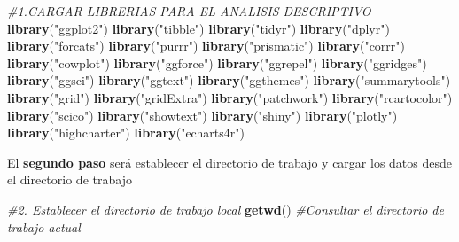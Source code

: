 \documentclass[
]{article}
\newenvironment{Shaded}{\begin{snugshade}}{\end{snugshade}}
\newcommand{\CommentTok}[1]{\textcolor[rgb]{0.56,0.35,0.01}{\textit{#1}}}
\newcommand{\FunctionTok}[1]{\textcolor[rgb]{0.13,0.29,0.53}{\textbf{#1}}}
\newcommand{\NormalTok}[1]{#1}
\newcommand{\StringTok}[1]{\textcolor[rgb]{0.31,0.60,0.02}{#1}}
\begin{document}
\begin{Shaded}
\begin{Highlighting}[]
\CommentTok{\#1.CARGAR LIBRERIAS PARA EL ANALISIS DESCRIPTIVO}
\FunctionTok{library}\NormalTok{(}\StringTok{"ggplot2"}\NormalTok{)}
\FunctionTok{library}\NormalTok{(}\StringTok{"tibble"}\NormalTok{)}
\FunctionTok{library}\NormalTok{(}\StringTok{"tidyr"}\NormalTok{)}
\FunctionTok{library}\NormalTok{(}\StringTok{"dplyr"}\NormalTok{)}
\FunctionTok{library}\NormalTok{(}\StringTok{"forcats"}\NormalTok{)}
\FunctionTok{library}\NormalTok{(}\StringTok{"purrr"}\NormalTok{)}
\FunctionTok{library}\NormalTok{(}\StringTok{"prismatic"}\NormalTok{)}
\FunctionTok{library}\NormalTok{(}\StringTok{"corrr"}\NormalTok{)}
\FunctionTok{library}\NormalTok{(}\StringTok{"cowplot"}\NormalTok{)}
\FunctionTok{library}\NormalTok{(}\StringTok{"ggforce"}\NormalTok{)}
\FunctionTok{library}\NormalTok{(}\StringTok{"ggrepel"}\NormalTok{)}
\FunctionTok{library}\NormalTok{(}\StringTok{"ggridges"}\NormalTok{)}
\FunctionTok{library}\NormalTok{(}\StringTok{"ggsci"}\NormalTok{)}
\FunctionTok{library}\NormalTok{(}\StringTok{"ggtext"}\NormalTok{)}
\FunctionTok{library}\NormalTok{(}\StringTok{"ggthemes"}\NormalTok{)}
\FunctionTok{library}\NormalTok{(}\StringTok{"summarytools"}\NormalTok{)}
\FunctionTok{library}\NormalTok{(}\StringTok{"grid"}\NormalTok{)}
\FunctionTok{library}\NormalTok{(}\StringTok{"gridExtra"}\NormalTok{)}
\FunctionTok{library}\NormalTok{(}\StringTok{"patchwork"}\NormalTok{)}
\FunctionTok{library}\NormalTok{(}\StringTok{"rcartocolor"}\NormalTok{)}
\FunctionTok{library}\NormalTok{(}\StringTok{"scico"}\NormalTok{)}
\FunctionTok{library}\NormalTok{(}\StringTok{"showtext"}\NormalTok{)}
\FunctionTok{library}\NormalTok{(}\StringTok{"shiny"}\NormalTok{)}
\FunctionTok{library}\NormalTok{(}\StringTok{"plotly"}\NormalTok{)}
\FunctionTok{library}\NormalTok{(}\StringTok{"highcharter"}\NormalTok{)}
\FunctionTok{library}\NormalTok{(}\StringTok{"echarts4r"}\NormalTok{)}
\end{Highlighting}
\end{Shaded}

El \textbf{segundo paso} será establecer el directorio de trabajo y
cargar los datos desde el directorio de trabajo

\begin{Shaded}
\begin{Highlighting}[]
\CommentTok{\#2. Establecer el directorio de trabajo local}
\FunctionTok{getwd}\NormalTok{() }\CommentTok{\#Consultar el directorio de trabajo actual }
\end{Highlighting}
\end{Shaded}
\end{document}
